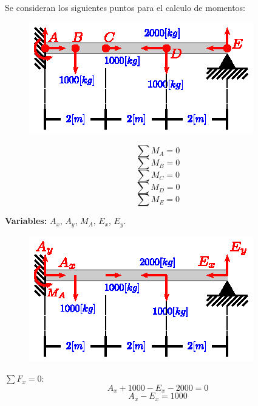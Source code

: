 \documentclass[letter,10pt,twoside]{article}
\begin{document}
Se consideran los siguientes puntos para el calculo de momentos:

\begin{figure}[H]
\centering
\includegraphics[scale=1.8]{resources/g03.eps}
\end{figure}

\begin{equation*}
    \sum{M_A} = 0
\end{equation*}
\begin{equation*}
    \sum{M_B} = 0
\end{equation*}
\begin{equation*}
    \sum{M_C} = 0
\end{equation*}
\begin{equation*}
    \sum{M_D} = 0
\end{equation*}
\begin{equation*}
    \sum{M_E} = 0
\end{equation*}

\textbf{Variables:} $A_x$, $A_y$, $M_A$, $E_x$, $E_y$.
\\

\begin{figure}[H]
\centering
\includegraphics[scale=1.8]{resources/h03.eps}
\end{figure}

$\sum{F_x} = 0$:
\begin{equation*}
    A_x + 1000 - E_x - 2000 = 0
\end{equation*}
\begin{equation*}
    A_x - E_x = 1000
\end{equation*}
\end{document}
